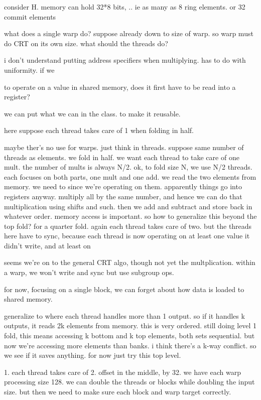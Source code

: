 consider H. memory can hold 32*8 bits, .. ie as many as 8 ring elements. or 32 commit elements

what does a single warp do?
suppose already down to size of warp.
so warp must do CRT on its own size. what should the threads do?


i don't understand putting address specifiers when multiplying. has to do with uniformity. 
if we

to operate on a value in shared memory, does it first have to be read into a register?

we can put what we can in the class. to make it reusable.

here suppose each thread takes care of 1 when folding in half. 

maybe ther's no use for warps.
just think in threads. suppose same number of threads as elements.
we fold in half. 
we want each thread to take care of one mult. the number of mults is always N/2.
ok, to fold size N, we use N/2 threads. each focuses on both parts, one mult and one add.
we read the two elements from memory. we need to since we're operating on them. apparently things go into registers anyway.
multiply all by the same number, and hence we can do that multiplication using shifts and such. then we add and subtract and store back in whatever order. 
memory access is important.
so how to generalize this beyond the top fold?
for a quarter fold. again each thread takes care of two. but the threads here have to sync, because each thread is now operating on at least one value it didn't write, and at least on

seems we're on to the general CRT algo, though not yet the multplication.
within a warp, we won't write and sync but use subgroup ops.

for now, focusing on a single block, we can forget about how data is loaded to shared memory. 

generalize to where each thread handles more than 1 output.
so if it handles k outputs, it reads 2k elements from memory.
this is very ordered.
still doing level 1 fold, this means accessing k bottom and k top elements, both sets sequential. but now we're accessing more elements than banks. i think there's a k-way conflict. so we see if it saves anything.
for now just try this top level.


1. each thread takes care of 2. offset in the middle, by 32.
we have each warp processing size 128.
we can double the threads or blocks while doubling the input size. but then we need to make sure each block and warp target correctly.

